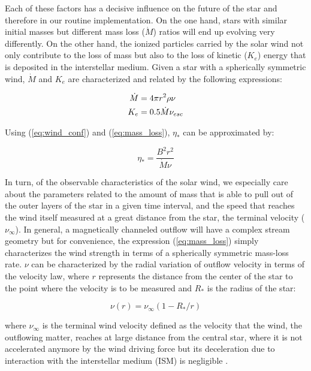 \documentclass[fleqn,usenatbib]{mnras}
\begin{document}
Each of these factors has a decisive influence on the future of the star and therefore in our routine implementation. On the one hand, stars with similar initial masses but different mass loss ($\Dot{M}$) ratios will end up evolving very differently. On the other hand, the ionized particles carried by the solar wind not only contribute to the loss of mass but also to the loss of kinetic ($K_e$) energy that is deposited in the interstellar medium. Given a star with a spherically symmetric wind, $\Dot{M}$ and $K_e$ are characterized and related by the following expressions:

\begin{ceqn}
\begin{align}
    \Dot{M} &= 4\pi r^2\rho\nu \label{eq:mass_loss}\\
    K_e &= 0.5\Dot{M}\nu_{esc}
\end{align}
\end{ceqn}

Using (\ref{eq:wind_conf}) and (\ref{eq:mass_loss}), $\eta_*$ can be approximated by: 
\begin{ceqn}
\begin{equation}
    \eta_* = \frac{B^{2}r^{2}}{\Dot{M}\nu} \label{eq:wind_conf2}
\end{equation}
\end{ceqn}

In turn, of the observable characteristics of the solar wind, we especially care about the parameters related to the amount of mass that is able to pull out of the outer layers of the star in a given time interval, and the speed that reaches the wind itself measured at a great distance from the star, the terminal velocity ($\nu_\infty$). In general, a magnetically channeled outflow will have a complex stream geometry but for convenience, the expression (\ref{eq:mass_loss}) simply characterizes the wind strength in terms of a spherically symmetric mass-loss rate. $\nu$ can be characterized by the radial variation of outflow velocity in terms of the velocity law, where $r$ represents the distance from the center of the star to the point where the velocity is to be measured and $R_*$ is the radius of the star:
\begin{ceqn}
\begin{equation}
    \nu(r) = \nu_\infty (1-R_*/r)
\end{equation}
\end{ceqn}
where $\nu_\infty$ is the terminal wind velocity defined as the velocity that the wind, the outflowing matter, reaches at large distance from the central star, where it is not accelerated anymore by the wind driving force but its deceleration due to interaction with the interstellar medium (ISM) is negligible \citep{Niedzielski2002}.\par
\end{document}
